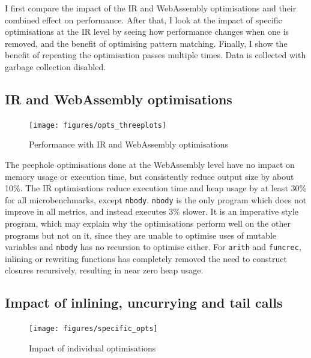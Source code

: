 I first compare the impact of the IR and WebAssembly optimisations and their combined effect on performance. After that, I look at the impact of specific optimisations at the IR level by seeing how performance changes when one is removed, and the benefit of optimising pattern matching. Finally, I show the benefit of repeating the optimisation passes multiple times. %
Data is collected with garbage collection disabled. %

\subsection{IR and WebAssembly optimisations}
\vspace{-0.4cm}
\begin{figure}[H]
\vspace{-0.05cm}
\hspace{-0.5cm}
\texttt{[image: figures/opts\_threeplots]}
\vspace{-0.6cm}
\caption{Performance with IR and WebAssembly optimisations}
 \label{fig:opts} 
\end{figure}
The peephole optimisations done at the WebAssembly level have no impact on memory usage or execution time, but consistently reduce output size by about 10\%. The IR optimisations reduce execution time and heap usage by at least 30\% for all microbenchmarks, except \verb|nbody|. \verb|nbody| is the only program which does not improve in all metrics, and instead executes 3\% slower. It is an imperative style program, which may explain why the optimisations perform well on the other programs but not on it, since they are unable to optimise uses of mutable variables and \verb|nbody| has no recursion to optimise either. 
 For \verb|arith| and \verb|funcrec|, inlining or rewriting functions has completely removed the need to construct closures recursively, resulting in near zero heap usage. %

\subsection{Impact of inlining, uncurrying and tail calls}
\vspace{-0.4cm}
\begin{figure}[H]
\hspace{-0.8cm}
\texttt{[image: figures/specific\_opts]}
\vspace{-1cm}
\caption{Impact of individual optimisations}
 \label{fig:specific-opts} 
\end{figure}


